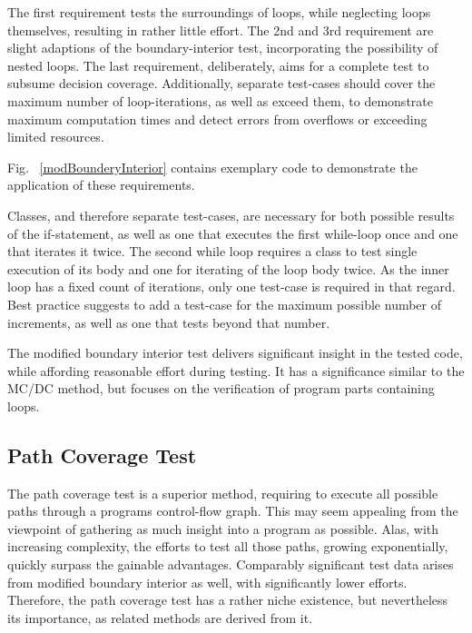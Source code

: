 		The first requirement tests the surroundings of loops, while neglecting loops themselves, resulting in rather little effort. The 2nd and 3rd requirement are slight adaptions of the boundary-interior test, incorporating the possibility of nested loops. The last requirement, deliberately, aims for a complete test to subsume decision coverage. Additionally, separate test-cases should cover the maximum number of loop-iterations, as well as exceed them, to demonstrate maximum computation times and detect errors from overflows or exceeding limited resources. 
		
		Fig. ~\ref{modBounderyInterior} contains exemplary code to demonstrate the application of these requirements.
		
		
		Classes, and therefore separate test-cases, are necessary for both possible results of the if-statement, as well as one that executes the first while-loop once and one that iterates it twice. The second while loop requires a class to test single execution of its body and one for iterating of the loop body twice. As the inner loop has a fixed count of iterations, only one test-case is required in that regard. Best practice suggests to add a test-case for the maximum possible number of increments, as well as one that tests beyond that number.

		The modified boundary interior test delivers significant insight in the tested code, while affording reasonable effort during testing. It has a significance similar to the MC/DC method, but focuses on the verification of program parts containing loops. 
		
	\subsection{Path Coverage Test}
		The path coverage test is a superior method, requiring to execute all possible paths through a programs control-flow graph. This may seem appealing from the viewpoint of gathering as much insight into a program as possible. Alas, with increasing complexity, the efforts to test all those paths, growing exponentially, quickly surpass the gainable advantages. Comparably significant test data arises from modified boundary interior as well, with significantly lower efforts. Therefore, the path coverage test has a rather niche existence, but nevertheless its importance, as related methods are derived from it.
		







	
	
